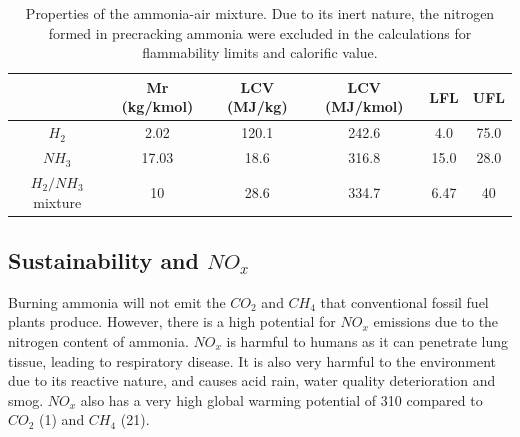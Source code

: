 \begin{table} [h]
\begin{center}
\caption{Properties of the ammonia-air mixture. Due to its inert nature, the nitrogen formed in precracking ammonia were excluded in the calculations for flammability limits and calorific value. \cite{FL}} \label{tab:mixproperties}
\begin{tabular}{ |c|c|c|c|c|c| }
 \hline
& Mr (kg/kmol) & LCV (MJ/kg) \cite{website:spg}& LCV (MJ/kmol) & LFL & UFL\\ 
 \hline
  $H_2$ & 2.02 & 120.1 & 242.6 & 4.0 & 75.0\\ 
 \hline
$NH_3$ & 17.03 & 18.6 & 316.8 & 15.0 & 28.0\\ 
 \hline
$H_2/NH_3$ mixture & 10 & 28.6 & 334.7 & 6.47 & 40\\
 \hline
\end{tabular}
\end{center} 
\end{table}

\subsection{Sustainability and $NO_x$} \label{ssec:NOx}
Burning ammonia will not emit the $CO_2$ and $CH_4$ that conventional fossil fuel plants produce. However,  there is a high potential for $NO_x$ emissions due to the nitrogen content of ammonia. $NO_x$ is harmful to humans as it can penetrate lung tissue, leading to respiratory disease. It is also very harmful to the environment due to its reactive nature, and causes acid rain, water quality deterioration and smog. \cite{NOxeffect} $NO_x$ also has a very high global warming potential of 310 compared to $CO_2$ (1) and $CH_4$ (21). \cite{website:NOXGWP} %

